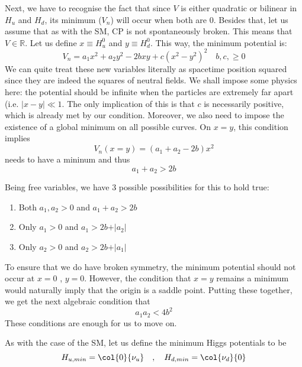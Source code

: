 Next, we have to recognise the fact that since $V$ is either quadratic or bilinear in $H_u$ and $H_d$, its minimum ($V_n$) will occur when both are $0$. Besides that, let us assume that as with the SM, CP is not spontaneously broken. This means that $V \in \mathbb{R}$. Let us define $x \equiv H^0_u$ and $y \equiv H^0_d$. This way, the minimum potential is:
\begin{equation}
    V_n = a_1 x^2 + a_2 y^2 - 2bxy + c(x^2 - y^2)^2 \quad b,c, \geq 0
    \label{eqn:16:constraint 1}
\end{equation}
We can quite treat these new variables literally as spacetime position squared since they are indeed the squares of neutral fields. We shall impose some physics here: the potential should be infinite when the particles are extremely far apart (i.e. $\vert x - y \vert \ll 1$. The only implication of this is that $c$ is necessarily positive, which is already met by our condition. Moreover, we also need to impose the existence of a global minimum on all possible curves. On $x = y$, this condition implies 
\begin{equation}
    V_n(x = y) = (a_1 + a_2 - 2b) x^2
\end{equation}
needs to have a mininum and thus
\begin{equation}
    a_1 + a_2 > 2b
    \label{eqn:16:constraint 2}
\end{equation}

Being free variables, we have 3 possible possibilities for this to hold true:
\begin{enumerate}
    \item Both $a_1, a_2 > 0$ and $a_1 + a_2 > 2b$
    \item Only $a_1 > 0$ and $a_1 > 2b + \vert a_2 \vert$
    \item Only $a_2 > 0$ and $a_2 > 2b + \vert a_1 \vert$
\end{enumerate}

To ensure that we do have broken symmetry, the minimum potential should not occur at $x = 0$ , $y = 0$. However, the condition that $x = y$ remains a minimum would naturally imply that the origin is a saddle point. Putting these together, we get the next algebraic condition that
\begin{equation}
    a_1a_2 < 4b^2
    \label{eqn:16:constraint 3}
\end{equation}
These conditions are enough for us to move on.

As with the case of the SM, let us define the minimum Higgs potentials to be 
\begin{equation}
    H_{u, min} = \col{0}{\nu_u} \quad , \quad H_{d, min} = \col{\nu_d}{0}
\end{equation}

